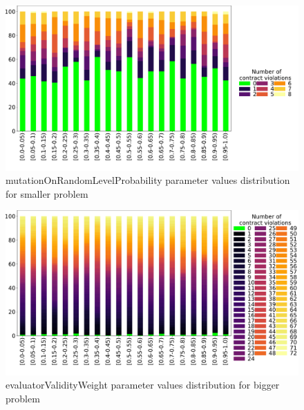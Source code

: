 \begin{figure}
	\centering
	\includegraphics[width=\textwidth]{images/DistrValiditySmall/mutationOnRandomLevelProbability.pdf}
	\caption[mutationOnRandomLevelProbability parameter values distribution for smaller problem]{mutationOnRandomLevelProbability parameter values distribution for smaller problem}
	\label{fig:mutationOnRandomLevelProbability_DistSmall}
\end{figure}
\begin{figure}
	\centering
	\includegraphics[width=\textwidth]{images/DistrValidityBig/evaluatorValidityWeight.pdf}
	\caption[evaluatorValidityWeight parameter values distribution for bigger problem]{evaluatorValidityWeight parameter values distribution for bigger problem}
	\label{fig:evaluatorValidityWeight_DistBig}
\end{figure}
